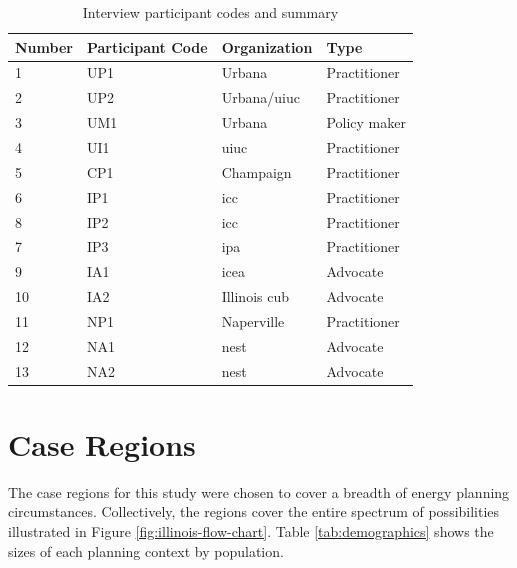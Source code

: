 \begin{table}[ht!]
    \centering
    \caption{Interview participant codes and summary}
    \label{tab:interviewees}
    \begin{tabular}{llll}
        \toprule
        Number & Participant Code & Organization & Type \\
        \midrule
        1& UP1 &Urbana& Practitioner\\ %
        2& UP2 &Urbana/\ac{uiuc}& Practitioner\\ %
        3& UM1 &Urbana & Policy maker\\ %
        4& UI1 & \ac{uiuc} & Practitioner\\ %
        5& CP1 & Champaign & Practitioner\\ %
        6& IP1 & \ac{icc} & Practitioner\\ %
        8& IP2 & \ac{icc} & Practitioner\\ %
        7& IP3 & \ac{ipa} & Practitioner\\ %
        9& IA1 &\ac{icea}& Advocate\\ %
        10& IA2 &Illinois \ac{cub} & Advocate\\ %
        11& NP1 & Naperville & Practitioner\\ %
        12& NA1 &\acs{nest}&Advocate\\ %
        13& NA2 &\acs{nest}&Advocate\\ %
        \bottomrule
    \end{tabular}
\end{table}


\section{Case Regions}
\label{section:cases}

The case regions for this study were chosen to cover a breadth of energy
planning circumstances. Collectively, the regions cover the entire spectrum of
possibilities illustrated in Figure \ref{fig:illinois-flow-chart}. Table
\ref{tab:demographics} shows the sizes of each planning context by population.

